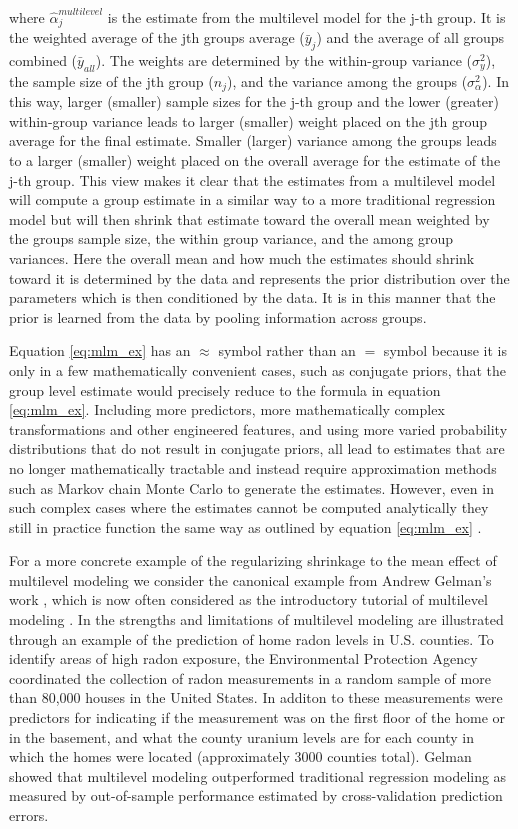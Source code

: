 where $\hat{\alpha}_j^{multilevel}$ is the estimate from the multilevel model for the j-th group. It is the weighted average of the jth groups average ($\bar{y}_j$) and the average of all groups combined ($\bar{y}_{all}$). The weights are determined by the within-group variance ($\sigma_y^2$), the sample size of the jth group ($n_j$), and the variance among the groups ($\sigma_{\alpha}^2$). In this way, larger (smaller) sample sizes for the j-th group and the lower (greater) within-group variance leads to larger (smaller) weight placed on the jth group average for the final estimate. Smaller (larger) variance among the groups leads to a larger (smaller) weight placed on the overall average for the estimate of the j-th group. This view makes it clear that the estimates from a multilevel model will compute a group estimate in a similar way to a more traditional regression model but will then shrink that estimate toward the overall mean weighted by the groups sample size, the within group variance, and the among group variances. Here the overall mean and how much the estimates should shrink toward it is determined by the data and represents the prior distribution over the parameters which is then conditioned by the data. It is in this manner that the prior is learned from the data by pooling information across groups.

Equation \ref{eq:mlm_ex} has an $\approx$ symbol rather than an $=$ symbol because it is only in a few mathematically convenient cases, such as conjugate priors, that the group level estimate would precisely reduce to the formula in equation \ref{eq:mlm_ex}. Including more predictors, more mathematically complex transformations and other engineered features, and using more varied probability distributions that do not result in conjugate priors, all lead to estimates that are no longer mathematically tractable and instead require approximation methods such as Markov chain Monte Carlo to generate the estimates. However, even in such complex cases where the estimates cannot be computed analytically they still in practice function the same way as outlined by equation \ref{eq:mlm_ex} \cite{Gelman2006}.

For a more concrete example of the regularizing shrinkage to the mean effect of multilevel modeling we consider the canonical example from Andrew Gelman's work \cite{Gelman2006} \cite{Gelman2006b}, which is now often considered as the introductory tutorial of multilevel modeling \cite{pymc32018}. In \cite{Gelman2006b} the strengths and limitations of multilevel modeling are illustrated through an example of the prediction of home radon levels in U.S. counties. To identify areas of high radon exposure, the Environmental Protection Agency coordinated the collection of radon measurements in a random sample of more than 80,000 houses in the United States. In additon to these measurements were predictors for indicating if the measurement was on the first floor of the home or in the basement, and what the county uranium levels are for each county in which the homes were located (approximately 3000 counties total). Gelman showed that multilevel modeling outperformed traditional regression modeling as measured by out-of-sample performance estimated by cross-validation prediction errors.

